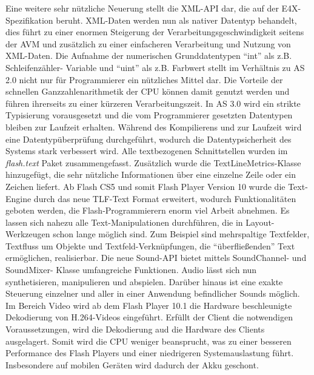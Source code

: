 Eine weitere sehr nützliche Neuerung stellt die XML-API dar, die auf der
E4X-Spezifikation beruht. XML-Daten werden nun als nativer Datentyp behandelt,
dies führt zu einer enormen Steigerung der Verarbeitungsgeschwindigkeit seitens
der AVM und zusätzlich zu einer einfacheren Verarbeitung und Nutzung von
XML-Daten.
Die Aufnahme der numerischen Grunddatentypen ``int'' als z.B. Schleifenzähler-
Variable und ``uint'' als z.B. Farbwert stellt im Verhältnis zu AS 2.0 nicht
nur für Programmierer ein nützliches Mittel dar. Die Vorteile der schnellen
Ganzzahlenarithmetik der CPU können damit genutzt werden und führen ihrerseits
zu einer kürzeren Verarbeitungszeit. In AS 3.0 wird ein strikte Typisierung
vorausgesetzt und die vom Programmierer gesetzten Datentypen bleiben zur
Laufzeit erhalten. Während des Kompilierens und zur Laufzeit wird eine
Datentypüberprüfung durchgeführt, wodurch die Datentypsicherheit des Systems
stark verbessert wird.
Alle textbezogenen Schnittstellen wurden im \emph{flash.text} Paket
zusammengefasst. Zusätzlich wurde die TextLineMetrics-Klasse hinzugefügt,
die sehr nützliche Informationen über eine einzelne Zeile oder ein Zeichen
liefert. Ab Flash CS5 und somit Flash Player Version 10 wurde die Text-Engine
durch das neue TLF-Text Format erweitert, wodurch Funktionalitäten geboten
werden, die Flash-Programmierern enorm viel Arbeit abnehmen. Es lassen sich
nahezu alle Text-Manipulationen durchführen, die in Layout-Werkzeugen schon
lange möglich sind. Zum Beispiel sind mehrspaltige Textfelder, Textfluss um
Objekte und Textfeld-Verknüpfungen, die "`überfließenden"' Text ermöglichen,
realisierbar. Die neue Sound-API bietet mittels SoundChannel- und SoundMixer-
Klasse umfangreiche Funktionen. Audio lässt sich nun synthetisieren,
manipulieren und abspielen. Darüber hinaus ist eine exakte Steuerung einzelner
und aller in einer Anwendung befindlicher Sounds möglich.
Im Bereich Video wird ab dem Flash Player 10.1 die Hardware beschleunigte
Dekodierung von H.264-Videos eingeführt. Erfüllt der Client die notwendigen
Voraussetzungen, wird die Dekodierung aud die Hardware des Clients
ausgelagert. Somit wird die CPU weniger beansprucht, was zu einer besseren
Performance des Flash Players und einer niedrigeren Systemauslastung führt.
Insbesondere auf mobilen Geräten wird dadurch der Akku geschont.

